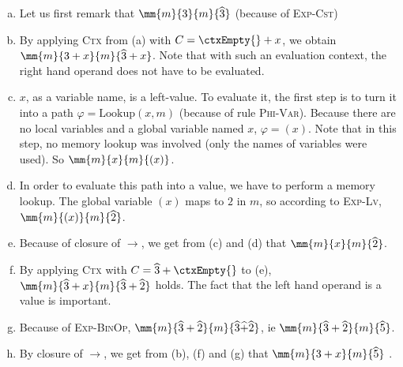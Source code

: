 \begin{enumerate}[(a)]
\item %
  Let us first remark that $\mm{m}{3}{m}{\widehat{3}}$
  (because of \textsc{Exp-Cst})
\item %
  By applying \textsc{Ctx} from (a)
  with $C = \ctxEmpty{} + x$, we obtain
  $\mm{m}{3+x}{m}{\widehat{3}+x}$.
  Note that with such an evaluation context, the right hand operand does not
  have to be evaluated.
\item %
  $x$, as a variable name, is a left-value. To evaluate it, the first step is to
  turn it into a path $φ = \mathrm{Lookup}(x, m)$ (because of rule
  \textsc{Phi-Var}). Because there are no local variables and a global variable
  named $x$, $φ = (x)$. Note that in this step, no memory lookup was involved
  (only the names of variables were used). So $\mm{m}{x}{m}{(x)}$.
\item %
  In order to evaluate this path into a value, we have to perform a memory
  lookup. The global variable $(x)$ maps to $2$ in $m$, so according to
  \textsc{Exp-Lv}, $\mm{m}{(x)}{m}{\widehat{2}}$.
\item %
  Because of closure of $→$, we get from (c) and (d) that
  $\mm{m}{x}{m}{\widehat{2}}$.
\item %
  By applying \textsc{Ctx} with $C = \widehat{3} + \ctxEmpty{}$ to (e),
  $\mm{m}{\widehat{3} + x}{m}{\widehat{3} + \widehat{2}}$ holds.
  The fact that the left hand operand is a value is important.
\item %
  Because of \textsc{Exp-BinOp},
  $\mm{m}{
  \widehat{3} + \widehat{2}
  }{m}{
  \widehat{3} \widehat{+} \widehat{2}
  }$, ie
  $\mm{m}{
  \widehat{3} + \widehat{2}
  }{m}{
  \widehat{5}
  }$.
\item %
  By closure of $→$, we get from
  (b), (f) and (g) that
  $\mm{m}{3+x}{m}{\widehat{5}}$
  .
\end{enumerate}

